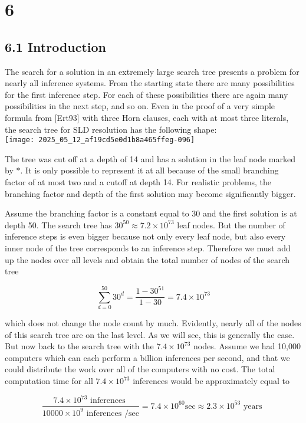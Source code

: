 \documentclass[10pt]{article}
\begin{document}
\section*{6}
\subsection*{6.1 Introduction}
The search for a solution in an extremely large search tree presents a problem for nearly all inference systems. From the starting state there are many possibilities for the first inference step. For each of these possibilities there are again many possibilities in the next step, and so on. Even in the proof of a very simple formula from [Ert93] with three Horn clauses, each with at most three literals, the search tree for SLD resolution has the following shape:\\
\texttt{[image: 2025\_05\_12\_af19cd5e0d1b8a465ffeg-096]}

The tree was cut off at a depth of 14 and has a solution in the leaf node marked by $*$. It is only possible to represent it at all because of the small branching factor of at most two and a cutoff at depth 14. For realistic problems, the branching factor and depth of the first solution may become significantly bigger.

Assume the branching factor is a constant equal to 30 and the first solution is at depth 50. The search tree has $30^{50} \approx 7.2 \times 10^{73}$ leaf nodes. But the number of inference steps is even bigger because not only every leaf node, but also every inner node of the tree corresponds to an inference step. Therefore we must add up the nodes over all levels and obtain the total number of nodes of the search tree

$$
\sum_{d=0}^{50} 30^{d}=\frac{1-30^{51}}{1-30}=7.4 \times 10^{73}
$$

which does not change the node count by much. Evidently, nearly all of the nodes of this search tree are on the last level. As we will see, this is generally the case. But now back to the search tree with the $7.4 \times 10^{73}$ nodes. Assume we had 10,000\\
computers which can each perform a billion inferences per second, and that we could distribute the work over all of the computers with no cost. The total computation time for all $7.4 \times 10^{73}$ inferences would be approximately equal to

$$
\frac{7.4 \times 10^{73} \text { inferences }}{10000 \times 10^{9} \text { inferences } / \mathrm{sec}}=7.4 \times 10^{60} \mathrm{sec} \approx 2.3 \times 10^{53} \text { years }
$$
\end{document}
